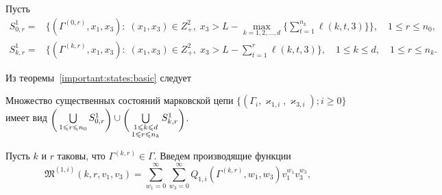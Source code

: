 \documentclass{report}
\begin{document}
Пусть
\begin{align*}
  S^1_{0,r} = & 
  \biggl\{
  (\Gamma^{(0,r)},x_1, x_3) \colon \; (x_1, x_3)\in Z^2_+,\; x_3 > L - \max\limits_{k=1, 2,
    \ldots, d}
  \biggl\{ \sum_{t=1}^{n_k} \ell({k,t,3}) \biggl\}\biggl\}, 
  \quad 1 \leqslant r \leqslant n_0, \\
  S^1_{k,r} = & 
  \biggl\{
  (\Gamma^{(k,r)},x_1, x_3) \colon \; (x_1, x_3)\in Z^2_+,\; x_3 > L - \sum_{t=1}^{r} \ell({k,t,3})
  \biggr\}, 
  \quad 1 \leqslant k \leqslant d, \quad 1 \leqslant r \leqslant n_k.
\end{align*}

Из теоремы~\ref{important:states:basic} следует 
\begin{theorem}
Множество существенных состояний марковской цепи $\{(\Gamma_i, \varkappa_{1,i},\varkappa_{3,i}); i \geqslant 0\}$ имеет вид $\raisebox{-.5ex}{$\biggl($}\bigcup\limits_{1 \leqslant r \leqslant n_0}S^1_{0,r}\raisebox{-.5ex}{$\biggr)$}\cup \raisebox{-.5ex}{$\biggl($}\bigcup\limits_{\substack{1 \leqslant k \leqslant d\\ 1 \leqslant r \leqslant n_k}} S^1_{k,r}\raisebox{-.5ex}{$\biggr)$}$.
\end{theorem}


Пусть $k$ и $r$ таковы, что $\Gamma^{(k,r)}\in \Gamma$. Введем производящие функции
\begin{equation*}
\mathfrak{M}^{(1,i)}(k,r,v_1,v_3) = \sum_{w_1=0}^{\infty}\sum_{w_3=0}^{\infty} Q_{1,i}(\Gamma^{(k,r)},w_1,w_3) v_1^{w_1} v_3^{w_3},
\end{equation*}
\end{document}
